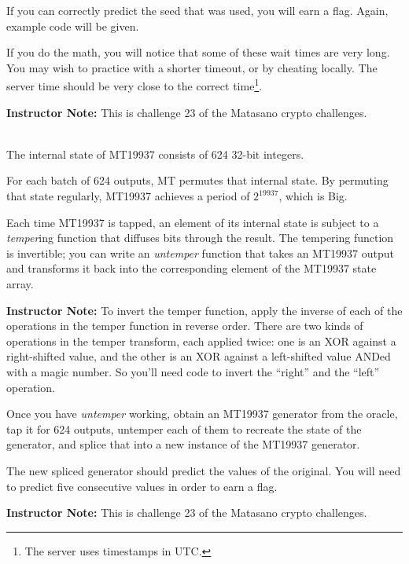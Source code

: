 \documentclass[11pt,oneside]{article}
\newcommand{\sectionfont}{phv} %
\renewcommand{\subsection}[1] {
    \vspace{12pt}{\fontfamily{\sectionfont}\selectfont\large\scshape\textbf{#1}}\\[-10pt]

}
\begin{document}
If you can correctly predict the seed that was used, you will earn a flag.
Again, example code will be given.

If you do the math, you will notice that some of these wait times are very long.
You may wish to practice with a shorter timeout, or by cheating locally. The
server time should be very close to the correct time\footnote{The server uses
timestamps in UTC.}.

\ifinstructornotes
\textbf{Instructor Note:} This is challenge 23 of the Matasano crypto
challenges.
\fi

\subsection{Part 2: State Reconstruction}

The internal state of MT19937 consists of 624 32-bit integers.

For each batch of 624 outputs, MT permutes that internal state. By permuting
that state regularly, MT19937 achieves a period of $2^{19937}$, which is Big.

Each time MT19937 is tapped, an element of its internal state is subject to a
\textit{temper}ing function that diffuses bits through the result. The tempering
function is invertible; you can write an \textit{untemper} function that takes
an MT19937 output and transforms it back into the corresponding element of the
MT19937 state array.

\ifinstructornotes
\textbf{Instructor Note:} To invert the temper function, apply the inverse of
each of the operations in the temper function in reverse order. There are two
kinds of operations in the temper transform, each applied twice: one is an XOR
against a right-shifted value, and the other is an XOR against a left-shifted
value ANDed with a magic number. So you'll need code to invert the ``right'' and
the ``left'' operation.
\fi

Once you have \textit{untemper} working, obtain an MT19937 generator from the
oracle, tap it for 624 outputs, untemper each of them to recreate the state of
the generator, and splice that into a new instance of the MT19937 generator.

The new spliced generator should predict the values of the original. You will
need to predict five consecutive values in order to earn a flag.

\ifinstructornotes
\textbf{Instructor Note:} This is challenge 23 of the Matasano crypto
challenges.
\fi
\end{document}
